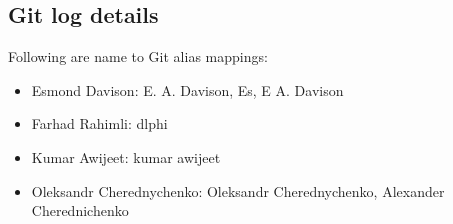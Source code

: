 \subsection{Git log details}
Following are name to Git alias mappings:

\begin{itemize}
   \item Esmond Davison: E. A. Davison, Es, E A. Davison
   \item Farhad Rahimli: dlphi
   \item Kumar Awijeet: kumar awijeet
   \item Oleksandr Cherednychenko: Oleksandr Cherednychenko,  Alexander Cherednichenko
\end{itemize}